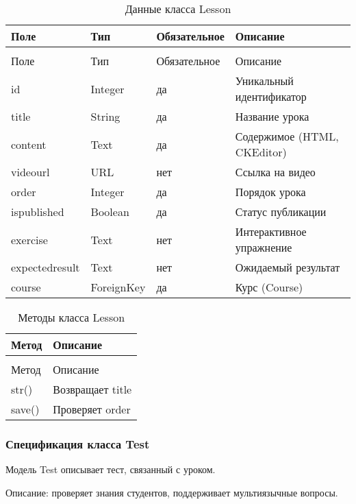 \begin{xltabular}{\textwidth}{|l|l|l|X|}
	\caption{Данные класса Lesson\label{tab:lesson_attributes}}\\
	\hline
	Поле & Тип & Обязательное & Описание \\ \hline
	\endfirsthead
	\\
	\hline
	Поле & Тип & Обязательное & Описание \\ \hline
	\endhead
	id & Integer & да & Уникальный идентификатор \\ \hline
	title & String & да & Название урока \\ \hline
	content & Text & да & Содержимое (HTML, CKEditor) \\ \hline
	videourl & URL & нет & Ссылка на видео \\ \hline
	order & Integer & да & Порядок урока \\ \hline
	ispublished & Boolean & да & Статус публикации \\ \hline
	exercise & Text & нет & Интерактивное упражнение \\ \hline
	expectedresult & Text & нет & Ожидаемый результат \\ \hline
	course & ForeignKey & да & Курс (Course) \\ \hline
\end{xltabular}

\begin{xltabular}{\textwidth}{|l|X|}
	\caption{Методы класса Lesson\label{tab:lesson_methods}}\\
	\hline
	Метод & Описание \\ \hline
	\endfirsthead
	\\
	\hline
	Метод & Описание \\ \hline
	\endhead
	str() & Возвращает title \\ \hline
	save() & Проверяет order \\ \hline
\end{xltabular}

\subsubsection{Спецификация класса Test}

Модель Test описывает тест, связанный с уроком.

Описание: проверяет знания студентов, поддерживает мультиязычные вопросы.

